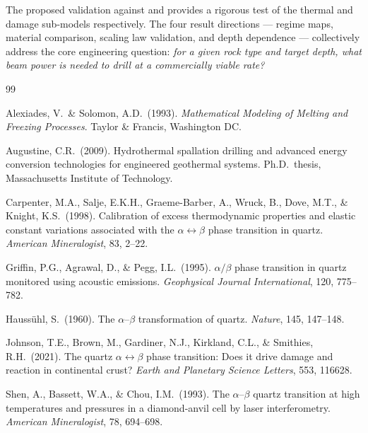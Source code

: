 \documentclass[12pt, a4paper]{article}
\begin{document}
The proposed validation against \citet{zhang2023thermal} and \citet{hu2018lrst}
provides a rigorous test of the thermal and damage sub-models respectively.
The four result directions — regime maps, material comparison, scaling law
validation, and depth dependence — collectively address the core engineering
question: \emph{for a given rock type and target depth, what beam power is
needed to drill at a commercially viable rate?}



\begin{thebibliography}{99}

Alexiades, V.\ \& Solomon, A.D.\ (1993).
\textit{Mathematical Modeling of Melting and Freezing Processes}.
Taylor \& Francis, Washington DC.

Augustine, C.R.\ (2009).
Hydrothermal spallation drilling and advanced energy conversion technologies
for engineered geothermal systems.
Ph.D.\ thesis, Massachusetts Institute of Technology.

Carpenter, M.A., Salje, E.K.H., Graeme-Barber, A., Wruck, B., Dove, M.T.,
\& Knight, K.S.\ (1998).
Calibration of excess thermodynamic properties and elastic constant variations
associated with the $\alpha \leftrightarrow \beta$ phase transition in quartz.
\textit{American Mineralogist}, 83, 2--22.

Griffin, P.G., Agrawal, D., \& Pegg, I.L.\ (1995).
$\alpha/\beta$ phase transition in quartz monitored using acoustic emissions.
\textit{Geophysical Journal International}, 120, 775--782.

Hauss\"{u}hl, S.\ (1960).
The $\alpha$--$\beta$ transformation of quartz.
\textit{Nature}, 145, 147--148.

Johnson, T.E., Brown, M., Gardiner, N.J., Kirkland, C.L., \&
Smithies, R.H.\ (2021).
The quartz $\alpha \leftrightarrow \beta$ phase transition: Does it drive
damage and reaction in continental crust?
\textit{Earth and Planetary Science Letters}, 553, 116628.

Shen, A., Bassett, W.A., \& Chou, I.M.\ (1993).
The $\alpha$--$\beta$ quartz transition at high temperatures and pressures
in a diamond-anvil cell by laser interferometry.
\textit{American Mineralogist}, 78, 694--698.



\end{thebibliography}
\end{document}
